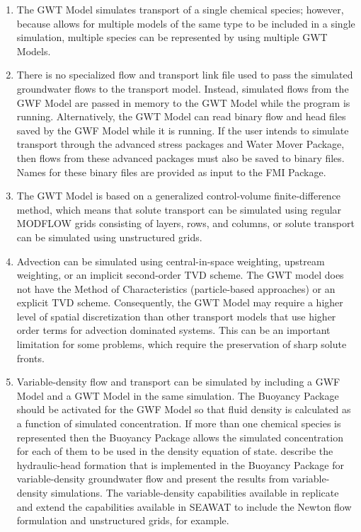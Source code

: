 \begin{enumerate}

\item The GWT Model simulates transport of a single chemical species; however, because \mf allows for multiple models of the same type to be included in a single simulation, multiple species can be represented by using multiple GWT Models.

\item There is no specialized flow and transport link file \citep{zheng2001modflow} used to pass the simulated groundwater flows to the transport model.  Instead, simulated flows from the GWF Model are passed in memory to the GWT Model while the program is running.  Alternatively, the GWT Model can read binary flow and head files saved by the GWF Model while it is running.  If the user intends to simulate transport through the advanced stress packages and Water Mover Package, then flows from these advanced packages must also be saved to binary files.  Names for these binary files are provided as input to the FMI Package.

\item The GWT Model is based on a generalized control-volume finite-difference method, which means that solute transport can be simulated using regular MODFLOW grids consisting of layers, rows, and columns, or solute transport can be simulated using unstructured grids.

\item Advection can be simulated using central-in-space weighting, upstream weighting, or an implicit second-order TVD scheme.  The GWT model does not have the Method of Characteristics (particle-based approaches) or an explicit TVD scheme.  Consequently, the GWT Model may require a higher level of spatial discretization than other transport models that use higher order terms for advection dominated systems.  This can be an important limitation for some problems, which require the preservation of sharp solute fronts. 

\item Variable-density flow and transport can be simulated by including a GWF Model and a GWT Model in the same \mf simulation.  The Buoyancy Package should be activated for the GWF Model so that fluid density is calculated as a function of simulated concentration.  If more than one chemical species is represented then the Buoyancy Package allows the simulated concentration for each of them to be used in the density equation of state.   \cite{langevin2020hydraulic} describe the hydraulic-head formation that is implemented in the Buoyancy Package for variable-density groundwater flow and present the results from \mf variable-density simulations.  The variable-density capabilities available in \mf replicate and extend the capabilities available in SEAWAT to include the Newton flow formulation and unstructured grids, for example.  


\end{enumerate}
